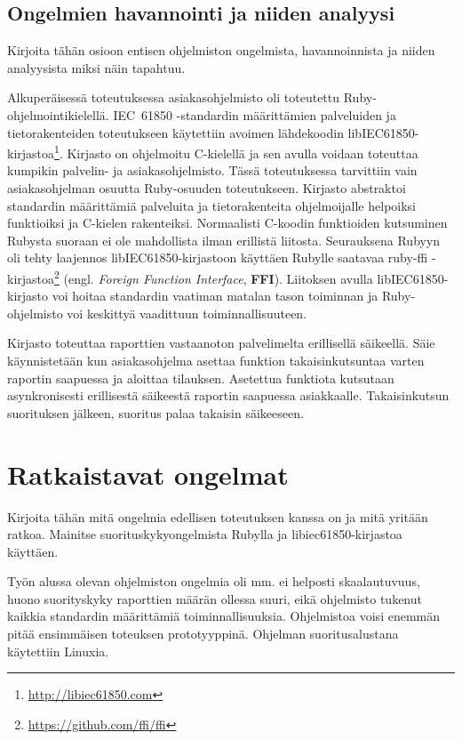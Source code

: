 \subsection{Ongelmien havannointi ja niiden analyysi}
\begin{it}
	Kirjoita tähän osioon entisen ohjelmiston ongelmista, havannoinnista ja niiden analyysista miksi näin tapahtuu.
\end{it}

Alkuperäisessä toteutuksessa asiakasohjelmisto oli toteutettu Ruby-ohjelmointikielellä. IEC~61850 -standardin määrittämien palveluiden ja tietorakenteiden toteutukseen käytettiin avoimen lähdekoodin libIEC61850-kirjastoa\footnote{\url{http://libiec61850.com}}. Kirjasto on ohjelmoitu C-kielellä ja sen avulla voidaan toteuttaa kumpikin palvelin- ja asiakasohjelmisto. Tässä toteutuksessa tarvittiin vain asiakasohjelman osuutta Ruby-osuuden toteutukseen. Kirjasto abstraktoi standardin määrittämiä palveluita ja tietorakenteita ohjelmoijalle helpoiksi funktioiksi ja C-kielen rakenteiksi. Normaalisti C-koodin funktioiden kutsuminen Rubysta suoraan ei ole mahdollista ilman erillistä liitosta. Seurauksena Rubyyn oli tehty laajennos libIEC61850-kirjastoon käyttäen Rubylle saatavaa ruby-ffi -kirjastoa\footnote{\url{https://github.com/ffi/ffi}} (engl. \emph{Foreign Function Interface}, \textbf{FFI}). Liitoksen avulla libIEC61850-kirjasto voi hoitaa standardin vaatiman matalan tason toiminnan ja Ruby-ohjelmisto voi keskittyä vaadittuun toiminnallisuuteen.

Kirjasto toteuttaa raporttien vastaanoton palvelimelta erillisellä säikeellä. Säie käynnistetään kun asiakasohjelma asettaa funktion takaisinkutsuntaa varten raportin saapuessa ja aloittaa tilauksen. Asetettua funktiota kutsutaan asynkronisesti erillisestä säikeestä raportin saapuessa asiakkaalle. Takaisinkutsun suorituksen jälkeen, suoritus palaa takaisin säikeeseen.

\section{Ratkaistavat ongelmat}
\begin{it}
	Kirjoita tähän mitä ongelmia edellisen toteutuksen kanssa on ja mitä yritään ratkoa. Mainitse suorituskykyongelmista Rubylla ja libiec61850-kirjastoa käyttäen.
\end{it}

Työn alussa olevan ohjelmiston ongelmia oli mm. ei helposti skaalautuvuus, huono suorityskyky raporttien määrän ollessa suuri, eikä ohjelmisto tukenut kaikkia standardin määrittämiä toiminnallisuuksia. Ohjelmistoa voisi enemmän pitää ensimmäisen toteuksen prototyyppinä. Ohjelman suoritusalustana käytettiin Linuxia.

